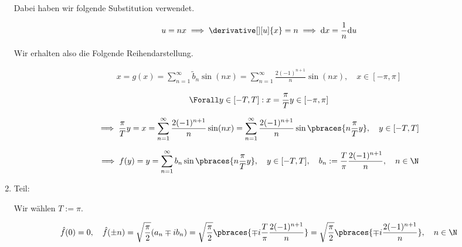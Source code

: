\begin{solution}
\begin{enumerate}[label = \arabic*.]
    Dabei haben wir folgende Substitution verwendet.

    \begin{align*}
        u = n x
        \implies
        \derivative[][u]{x} = n
        \implies
        \mathrm{d} x = \frac{1}{n} \mathrm{d}u
    \end{align*}

    Wir erhalten also die Folgende Reihendarstellung.

    \begin{align*}
        x
        =
        g(x)
        =
        \sum_{n=1}^\infty
        \tilde b_n
        \sin(n x)
        =
        \sum_{n=1}^\infty
        \frac{2 (-1)^{n+1}}{n}
        \sin(n x),
        \quad
        x \in [-\pi, \pi]
    \end{align*}

    \begin{align*}
        \Forall y \in [-T, T]:
        x = \frac{\pi}{T} y \in [-\pi, \pi]
    \end{align*}

    \begin{align*}
        \implies
        \frac{\pi}{T} y
        =
        x
        =
        \sum_{n=1}^\infty
        \frac{2 (-1)^{n+1}}{n}
        \sin(n x)
        =
        \sum_{n=1}^\infty
        \frac{2 (-1)^{n+1}}{n}
        \sin \pbraces{n \frac{\pi}{T} y},
        \quad
        y \in [-T, T]
    \end{align*}

    \begin{align*}
        \implies
        f(y)
        =
        y
        =
        \sum_{n=1}^\infty
        b_n
        \sin \pbraces{n \frac{\pi}{T} y},
        \quad
        y \in [-T, T],
        \quad
        b_n
        :=
        \frac{T}{\pi}
        \frac{2 (-1)^{n+1}}{n},
        \quad
        n \in \N
    \end{align*}

    \item Teil:
    

    Wir wählen $T := \pi$.

    \begin{align*}
        \hat f(0)
        =
        0,
        \quad
        \hat f(\pm n)
        =
        \sqrt \frac{\pi}{2}
        (a_n \mp i b_n)
        =
        \sqrt \frac{\pi}{2}
        \pbraces
        {
            \mp i
            \frac{T}{\pi}
            \frac{2 (-1)^{n+1}}{n}
        }
        =
        \sqrt \frac{\pi}{2}
        \pbraces
        {
            \mp i
            \frac{2 (-1)^{n+1}}{n}
        },
        \quad
        n \in \N
    \end{align*}


\end{enumerate}
\end{solution}
